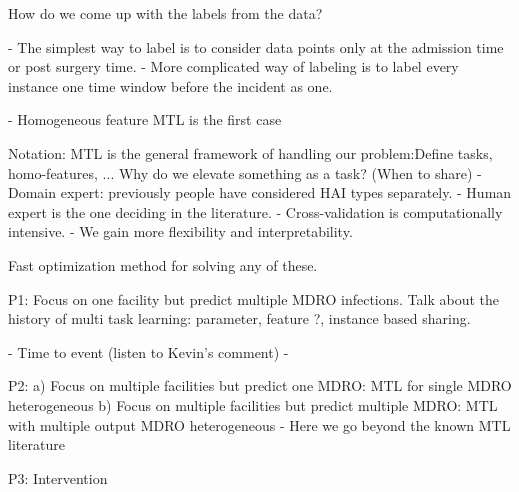 How do we come up with the labels from the data? 

- The simplest way to label is to consider data points only at the admission time or post surgery time. 
- More complicated way of labeling is to label every instance one time window before the incident as one. 


- Homogeneous feature MTL is the first case

Notation:
	MTL is the general framework of handling our problem:Define tasks, homo-features, ...
	Why do we elevate something as a task? (When to share)
		- Domain expert: previously people have considered HAI types separately. 
			- Human expert is the one deciding in the literature.
			- Cross-validation is computationally intensive. 
		- We gain more flexibility and interpretability. 
	
Fast optimization method for solving any of these. 
	
P1: Focus on one facility but predict multiple MDRO infections. 
Talk about the history of multi task learning: parameter, feature ?, instance based sharing. 

	- Time to event (listen to Kevin's comment)
	- 

P2: 
a) Focus on multiple facilities but predict one MDRO: MTL for single MDRO heterogeneous
b) Focus on multiple facilities but predict multiple MDRO: MTL with multiple output MDRO heterogeneous
 - Here we go beyond the known MTL literature
 
P3: Intervention


